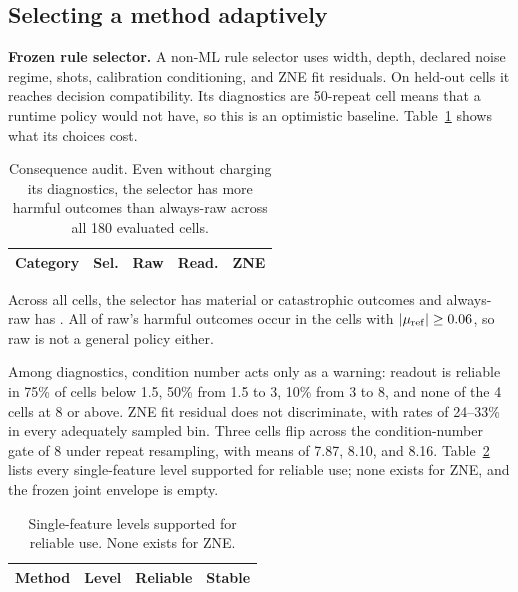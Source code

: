 \documentclass[10pt,twocolumn]{article}
\newcommand{\paragraphlead}[1]{\textbf{#1}\quad}
\begin{document}
\subsection{Selecting a method adaptively}
\label{sec:selector}
\paragraphlead{Frozen rule selector.}
A non-ML rule selector uses width, depth, declared noise regime, shots, calibration conditioning,
and ZNE fit residuals. On \HoldoutCells{} held-out cells it reaches \HoldoutCompatibilityVTwo{}
decision compatibility. Its diagnostics are 50-repeat cell means that a runtime policy would not
have, so this is an optimistic baseline. Table~\ref{tab:audit} shows what its choices cost.

\begin{table}[t]
\centering
\caption{Consequence audit. Even without charging its diagnostics, the selector has more harmful
outcomes than always-raw across all 180 evaluated cells.}
\label{tab:audit}
\small
\begin{tabular}{lrrrr}
\toprule
Category & Sel. & Raw & Read. & ZNE\\
\midrule

\end{tabular}
\end{table}

Across all cells, the selector has \SelectorHarm{} material or catastrophic outcomes and always-raw
has \AlwaysRawHarm{}. All of raw's harmful outcomes occur in the \StrongSignalCells{} cells with
$|\mu_{\rm ref}|\geq0.06$, so raw is not a general policy either.

Among diagnostics, condition number acts only as a warning: readout is reliable in 75\% of
cells below 1.5, 50\% from 1.5 to 3, 10\% from 3 to 8, and none of the 4 cells at 8 or above.
ZNE fit residual does not discriminate, with rates of 24--33\% in every adequately sampled bin.
Three cells flip across the condition-number gate of 8 under repeat resampling, with means of
7.87, 8.10, and 8.16. Table~\ref{tab:envelope} lists every single-feature level supported for
reliable use; none exists for ZNE, and the frozen joint envelope is empty.

\begin{table}[t]
\centering
\caption{Single-feature levels supported for reliable use. None exists for ZNE.}
\label{tab:envelope}
\small
\begin{tabular}{llrr}
\toprule
Method & Level & Reliable & Stable\\
\midrule

\end{tabular}
\end{table}
\end{document}

